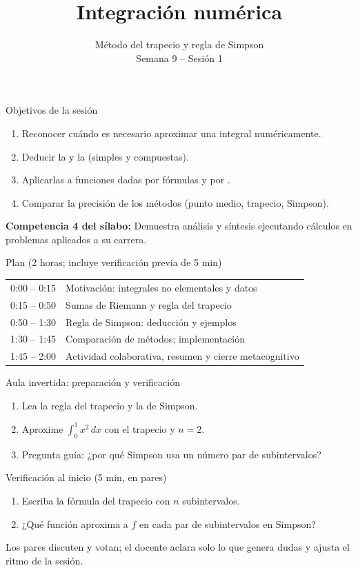 \documentclass[10pt,aspectratio=169]{beamer}
\title[Integración numérica]{Integración numérica}
\subtitle{Método del trapecio y regla de Simpson\\[2pt]\small Semana 9 -- Sesión 1}
\begin{document}
\begin{frame}
  \titlepage
\end{frame}

\begin{frame}{Objetivos de la sesión}
  \begin{enumerate}
    \item Reconocer cuándo es necesario aproximar una integral numéricamente.
    \item Deducir la  y la  (simples y compuestas).
    \item Aplicarlas a funciones dadas por fórmulas y por .
    \item Comparar la precisión de los métodos (punto medio, trapecio, Simpson).
  \end{enumerate}
  \vspace{1mm}
  {\small\textbf{Competencia 4 del sílabo:} Demuestra análisis y síntesis ejecutando cálculos en problemas aplicados a su carrera.}
  \begin{block}{Plan (2 horas; incluye verificación previa de 5 min)}
    \begin{tabular}{ll}
      0:00 -- 0:15 & Motivación: integrales no elementales y datos\\
      0:15 -- 0:50 & Sumas de Riemann y regla del trapecio\\
      0:50 -- 1:30 & Regla de Simpson: deducción y ejemplos\\
      1:30 -- 1:45 & Comparación de métodos; implementación\\
      1:45 -- 2:00 & Actividad colaborativa, resumen y cierre metacognitivo
    \end{tabular}
  \end{block}
\end{frame}

\begin{frame}{Aula invertida: preparación y verificación}
  \small
  \begin{previa}
    \begin{enumerate}
      \item Lea la regla del trapecio y la de Simpson.
      \item Aproxime $\int_0^1 x^2\,dx$ con el trapecio y $n=2$.
      \item Pregunta guía: ¿por qué Simpson usa un número par de subintervalos?
    \end{enumerate}
  \end{previa}
  \begin{block}{Verificación al inicio (5 min, en pares)}
    \begin{enumerate}
      \item Escriba la fórmula del trapecio con $n$ subintervalos.
      \item ¿Qué función aproxima a $f$ en cada par de subintervalos en Simpson?
    \end{enumerate}
    Los pares discuten y votan; el docente aclara solo lo que genera dudas y ajusta el ritmo de la sesión.
  \end{block}
\end{frame}
\end{document}
